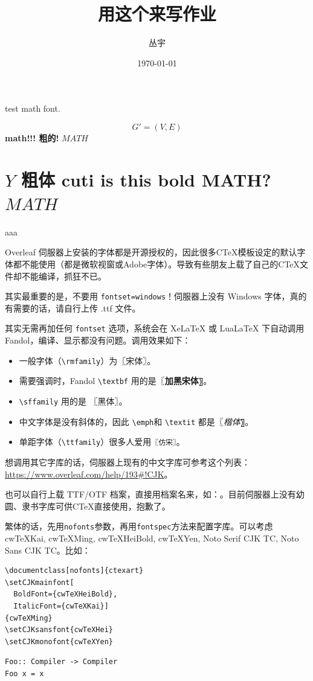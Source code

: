 \documentclass[11pt]{article}
\title{用这个来写作业}
\author{丛宇}
\date{\today}
\begin{document}
\maketitle

test math font.

\[
G'=(V,E)
\]
\textbf{math!!! 粗的!}
$MATH$

\section{$Y$ 粗体 cuti is this bold MATH? $MATH$}
\begin{theorem}[sbada]
    aaa
\end{theorem}


Overleaf 伺服器上安装的字体都是开源授权的，因此很多C\TeX{}模板设定的默认字体都不能使用（都是微软视窗或Adobe字体）。导致有些朋友上载了自己的C\TeX{}文件却不能编译，抓狂不已。

其实最重要的是，不要用 \verb|fontset=windows|！伺服器上没有 Windows 字体，真的有需要的话，请自行上传 .ttf 文件。

其实无需再加任何 \verb|fontset| 选项，系统会在 XeLaTeX 或 LuaLaTeX 下自动调用 Fandol，编译、显示都没有问题。调用效果如下：

\begin{itemize}
\item 一般字体（\verb|\rmfamily|）为〖宋体〗。
\item 需要强调时，Fandol \verb|\textbf| 用的是〖\textbf{加黑宋体}〗。
\item \verb|\sffamily| 用的是 〖\textsf{黑体}〗。
\item 中文字体是没有斜体的，因此 \verb|\emph|和 \verb|\textit| 都是〖\textit{楷体}〗。

\item 单距字体（\verb|\ttfamily|）很多人爱用\texttt{〖仿宋〗}。

\end{itemize}


想调用其它字库的话，伺服器上现有的中文字库可参考这个列表：\url{https://www.overleaf.com/help/193#!CJK}。

也可以自行上载 TTF/OTF 档案，直接用档案名来，如：\texttt{\setmainfont{shuti.otf}}。目前伺服器上没有幼圆、隶书字库可供C\TeX{}直接使用，抱歉了。


繁体的话，先用\verb|nofonts|参数，再用\verb|fontspec|方法来配置字库。可以考虑 cwTeXKai, cwTeXMing, cwTeXHeiBold, cwTeXYen, Noto Serif CJK TC, Noto Sans CJK TC。比如：

\begin{verbatim}
\documentclass[nofonts]{ctexart}
\setCJKmainfont[
  BoldFont={cwTeXHeiBold},
  ItalicFont={cwTeXKai}]
{cwTeXMing}
\setCJKsansfont{cwTeXHei}
\setCJKmonofont{cwTeXYen}
\end{verbatim} 

\begin{verbatim}
Foo:: Compiler -> Compiler
Foo x = x
\end{verbatim}
\end{document}
